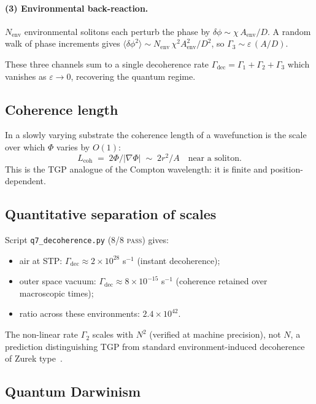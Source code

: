 \documentclass[11pt,a4paper]{article}
\renewcommand{\Phi}{\varPhi}
\newcommand{\chiTGP}{\chi}
\newcommand{\Lcoh}{L_{\mathrm{coh}}}
\newcommand{\eps}{\varepsilon}
\begin{document}
\paragraph{(3) Environmental back-reaction.}
$N_{\mathrm{env}}$ environmental solitons each perturb the phase by
$\delta\phi\sim\chiTGP\,A_{\mathrm{env}}/D$. A random walk of phase
increments gives
$\langle\delta\phi^{2}\rangle\sim N_{\mathrm{env}}\,\chiTGP^{2}
  A_{\mathrm{env}}^{2}/D^{2}$,
so $\Gamma_{3}\sim\eps\,(A/D)$.

These three channels sum to a single decoherence rate
$\Gamma_{\mathrm{dec}}=\Gamma_{1}+\Gamma_{2}+\Gamma_{3}$ which
vanishes as $\eps\to 0$, recovering the quantum regime.

\subsection{Coherence length}

In a slowly varying substrate the coherence length of a wavefunction
is the scale over which $\Phi$ varies by $O(1)$:
\begin{equation}\label{eq:Lcoh}
  \Lcoh \;=\; 2\Phi/|\nabla\Phi| \;\sim\; 2r^{2}/A \quad\text{near a soliton}.
\end{equation}
This is the TGP analogue of the Compton wavelength: it is finite and
position-dependent.

\subsection{Quantitative separation of scales}

Script \verb|q7_decoherence.py| (8/8 \textsc{pass}) gives:
\begin{itemize}[leftmargin=1.4em,nosep]
\item air at STP: $\Gamma_{\mathrm{dec}}\approx 2\times 10^{28}$ s$^{-1}$
  (instant decoherence);
\item outer space vacuum:
  $\Gamma_{\mathrm{dec}}\approx 8\times 10^{-15}$ s$^{-1}$
  (coherence retained over macroscopic times);
\item ratio across these environments: $2.4\times 10^{42}$.
\end{itemize}
The non-linear rate $\Gamma_{2}$ scales with $N^{2}$
(verified at machine precision), not $N$, a prediction distinguishing
TGP from standard environment-induced decoherence of Zurek
type~\cite{Zurek2003}.

\subsection{Quantum Darwinism}
\end{document}
